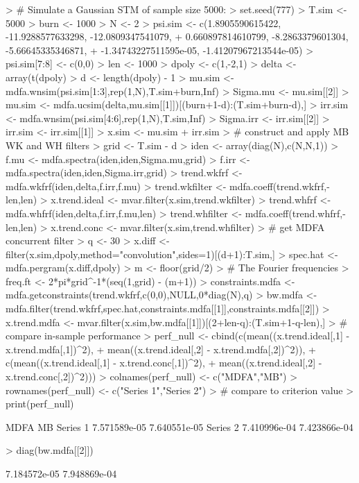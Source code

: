 \documentclass[a4paper]{book}
\begin{document}
\begin{Schunk}
\begin{Sinput}
> # Simulate a Gaussian STM  of sample size 5000:
> set.seed(777)
> T.sim <- 5000
> burn <- 1000
> N <- 2
> psi.sim <- c(1.8905590615422, -11.9288577633298, -12.0809347541079, 
+              0.660897814610799, -8.2863379601304, -5.66645335346871, 
+              -1.34743227511595e-05, -1.41207967213544e-05)
> psi.sim[7:8] <- c(0,0)
> len <- 1000
> dpoly <- c(1,-2,1)
> delta <- array(t(dpoly) %
> d <- length(dpoly) - 1
> mu.sim <- mdfa.wnsim(psi.sim[1:3],rep(1,N),T.sim+burn,Inf)
> Sigma.mu <- mu.sim[[2]]
> mu.sim <- mdfa.ucsim(delta,mu.sim[[1]])[(burn+1-d):(T.sim+burn-d),]
> irr.sim <- mdfa.wnsim(psi.sim[4:6],rep(1,N),T.sim,Inf)
> Sigma.irr <- irr.sim[[2]]
> irr.sim <- irr.sim[[1]] 
> x.sim <- mu.sim + irr.sim
> # construct and apply MB WK and WH filters
> grid <- T.sim - d
> iden <- array(diag(N),c(N,N,1))
> f.mu <- mdfa.spectra(iden,iden,Sigma.mu,grid)
> f.irr <- mdfa.spectra(iden,iden,Sigma.irr,grid)
> trend.wkfrf <- mdfa.wkfrf(iden,delta,f.irr,f.mu)
> trend.wkfilter <- mdfa.coeff(trend.wkfrf,-len,len)
> x.trend.ideal <- mvar.filter(x.sim,trend.wkfilter)
> trend.whfrf <- mdfa.whfrf(iden,delta,f.irr,f.mu,len)
> trend.whfilter <- mdfa.coeff(trend.whfrf,-len,len)
> x.trend.conc <- mvar.filter(x.sim,trend.whfilter)
> # get MDFA concurrent filter
> q <- 30
> x.diff <- filter(x.sim,dpoly,method="convolution",sides=1)[(d+1):T.sim,]
> spec.hat <- mdfa.pergram(x.diff,dpoly)
> m <- floor(grid/2)
> # The Fourier frequencies
> freq.ft <- 2*pi*grid^{-1}*(seq(1,grid) - (m+1))
> constraints.mdfa <- mdfa.getconstraints(trend.wkfrf,c(0,0),NULL,0*diag(N),q)
> bw.mdfa <- mdfa.filter(trend.wkfrf,spec.hat,constraints.mdfa[[1]],constraints.mdfa[[2]])
> x.trend.mdfa <- mvar.filter(x.sim,bw.mdfa[[1]])[(2+len-q):(T.sim+1-q-len),]
> # compare in-sample performance
> perf_null <- cbind(c(mean((x.trend.ideal[,1] - x.trend.mdfa[,1])^2),
+ 	mean((x.trend.ideal[,2] - x.trend.mdfa[,2])^2)),
+   c(mean((x.trend.ideal[,1] - x.trend.conc[,1])^2),
+ 	mean((x.trend.ideal[,2] - x.trend.conc[,2])^2)))
> colnames(perf_null) <- c("MDFA","MB")
> rownames(perf_null) <- c("Series 1","Series 2")
> # compare to criterion value
> print(perf_null)
\end{Sinput}
\begin{Soutput}
                 MDFA           MB
Series 1 7.571589e-05 7.640551e-05
Series 2 7.410996e-04 7.423866e-04
\end{Soutput}
\begin{Sinput}
> diag(bw.mdfa[[2]])
\end{Sinput}
\begin{Soutput}
[1] 7.184572e-05 7.948869e-04
\end{Soutput}
\end{Schunk}
\end{document}
